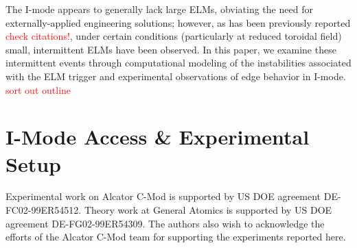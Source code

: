 \documentclass[12pt,floatfix,showpacs]{revtex4-1}
\newcommand{\note}[1]{\textcolor{red}{#1}}
\begin{document}
The I-mode appears to generally lack large ELMs, obviating the need for externally-applied engineering solutions; however, as has been previously reported \cite{Whyte2010,Walk2014b}\note{check citations!}, under certain conditions (particularly at reduced toroidal field) small, intermittent ELMs have been observed.
In this paper, we examine these intermittent events through computational modeling of the instabilities associated with the ELM trigger and experimental observations of edge behavior in I-mode.  \note{sort out outline}

\section{I-Mode Access \& Experimental Setup}\label{sec:setup}


\begin{acknowledgments}
 Experimental work on Alcator C-Mod is supported by US DOE agreement DE-FC02-99ER54512. Theory work at General Atomics is supported by US DOE agreement DE-FG02-99ER54309.  The authors also wish to acknowledge the efforts of the Alcator C-Mod team for supporting the experiments reported here.
\end{acknowledgments}



\end{document}
